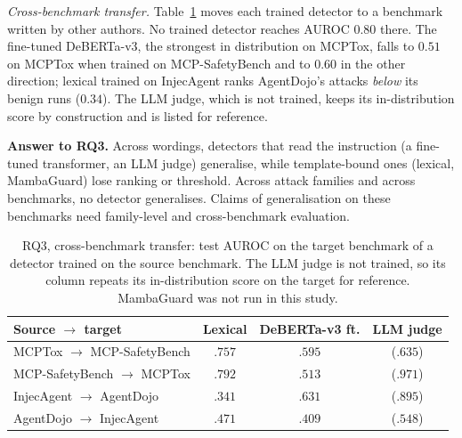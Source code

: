\documentclass[conference,compsoc]{IEEEtran}
\begin{document}
\emph{Cross-benchmark transfer.} Table~\ref{tab:transfer} moves each trained detector to a benchmark written by other authors. No trained detector reaches AUROC $0.80$ there. The fine-tuned DeBERTa-v3, the strongest in distribution on MCPTox, falls to $0.51$ on MCPTox when trained on MCP-SafetyBench and to $0.60$ in the other direction; lexical trained on InjecAgent ranks AgentDojo's attacks \emph{below} its benign runs ($0.34$). The LLM judge, which is not trained, keeps its in-distribution score by construction and is listed for reference.

\textbf{Answer to RQ3.} Across wordings, detectors that read the instruction (a fine-tuned transformer, an LLM judge) generalise, while template-bound ones (lexical, MambaGuard) lose ranking or threshold. Across attack families and across benchmarks, no detector generalises. Claims of generalisation on these benchmarks need family-level and cross-benchmark evaluation.

\begin{table}[!t]
\centering
\caption{RQ3, cross-benchmark transfer: test AUROC on the target benchmark of a detector trained on the source benchmark. The LLM judge is not trained, so its column repeats its in-distribution score on the target for reference. MambaGuard was not run in this study.}
\label{tab:transfer}
\footnotesize
\renewcommand{\arraystretch}{1.12}
\setlength{\tabcolsep}{3pt}
\begin{tabular}{@{}lccc@{}}
\toprule
\textbf{Source $\rightarrow$ target} & \textbf{Lexical} & \textbf{DeBERTa-v3 ft.} & \textbf{LLM judge} \\
\midrule
MCPTox $\rightarrow$ MCP-SafetyBench & $.757$ & $.595$ & ($.635$) \\
MCP-SafetyBench $\rightarrow$ MCPTox & $.792$ & $.513$ & ($.971$) \\
InjecAgent $\rightarrow$ AgentDojo   & $.341$ & $.631$ & ($.895$) \\
AgentDojo $\rightarrow$ InjecAgent   & $.471$ & $.409$ & ($.548$) \\
\bottomrule
\end{tabular}
\end{table}
\end{document}
